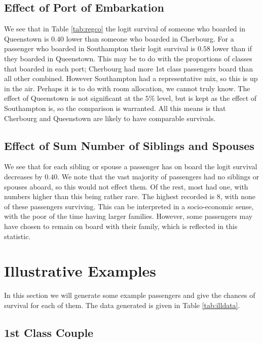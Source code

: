 \documentclass[9pt]{extarticle}
\begin{document}
\subsection{Effect of Port of Embarkation}

We see that in Table \ref{tab:regco} the logit survival of someone who boarded in Queenstown is $0.40$ lower than someone who boarded in Cherbourg. For a passenger who boarded in Southampton their logit survival is $0.58$ lower than if they boarded in Queenstown. This may be to do with the proportions of classes that boarded in each port; Cherbourg had more 1st class passengers board than all other combined. However Southampton had a representative mix, so this is up in the air. Perhaps it is to do with room allocation, we cannot truly know. The effect of Queenstown is not significant at the $5\%$ level, but is kept as the effect of Southampton is, so the comparison is warranted. All this means is that Cherbourg and Queenstown are likely to have comparable survivals.

\subsection{Effect of Sum Number of Siblings and Spouses}

We see that for each sibling or spouse a passenger has on board the logit survival decreases by $0.40$. We note that the vast majority of passengers had no siblings or spouses aboard, so this would not effect them. Of the rest, most had one, with numbers higher than this being rather rare. The highest recorded is 8, with none of these passengers surviving. This can be interpreted in a socio-economic sense, with the poor of the time having larger families. However, some passengers may have chosen to remain on board with their family, which is reflected in this statistic.

\section{Illustrative Examples}

In this section we will generate some example passengers and give the chances of survival for each of them. The data generated is given in Table \ref{tab:illdata}.

\subsection{1st Class Couple}
\end{document}
